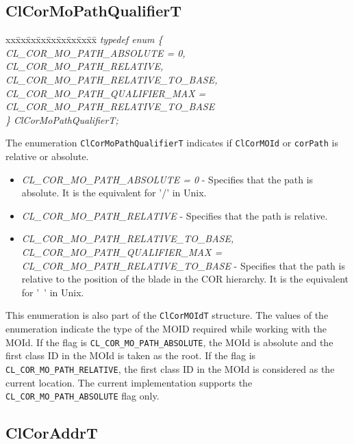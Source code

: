 \begin{flushleft}
\subsection{ClCorMoPathQualifierT}
\begin{tabbing}
xx\=xx\=xx\=xx\=xx\=xx\=xx\=xx\=xx\=\kill
\textit{typedef enum \{}\\
\>\>\>\>\textit{CL\_COR\_MO\_PATH\_ABSOLUTE = 0,}\\
\>\>\>\>\textit{CL\_COR\_MO\_PATH\_RELATIVE,}\\
\>\>\>\>\textit{CL\_COR\_MO\_PATH\_RELATIVE\_TO\_BASE, CL\_COR\_MO\_PATH\_QUALIFIER\_MAX =}\\
\>\>\>\>\textit{CL\_COR\_MO\_PATH\_RELATIVE\_TO\_BASE}\\
\textit{\} ClCorMoPathQualifierT;}\end{tabbing}

The enumeration {\tt{ClCorMoPathQualifierT}} indicates if {\tt{ClCorMOId}} or {\tt{corPath}} is relative or absolute.
\begin{itemize}
\item
\textit{CL\_\-COR\_\-MO\_\-PATH\_\-ABSOLUTE = 0} - Specifies that the path is absolute. It is the equivalent for '/' in Unix.
\item
\textit{CL\_\-COR\_\-MO\_\-PATH\_\-RELATIVE} - Specifies that the path is relative.
\item
\textit{CL\_\-COR\_\-MO\_\-PATH\_\-RELATIVE\_\-TO\_\-BASE, CL\_\-COR\_\-MO\_\-PATH\_\-QUALIFIER\_\-MAX = CL\_\-COR\_\-MO\_\-PATH\_\-RELATIVE\_\-TO\_\-BASE} - 
Specifies that the path is relative to the position of the blade in the COR hierarchy. It is the equivalent for '~' in Unix.
\end{itemize}
This enumeration is also part of the {\tt{ClCorMOIdT}} structure. The values of the enumeration indicate the type of the MOID required 
while working with the MOId. If the flag is {\tt{CL\_\-COR\_\-MO\_\-PATH\_\-ABSOLUTE}}, the MOId is absolute and the first class ID in the 
MOId is taken as the root. If the flag is {\tt{CL\_\-COR\_\-MO\_\-PATH\_\-RELATIVE}}, the first class ID in the MOId is considered as the current location. 
The current implementation supports the {\tt{CL\_\-COR\_\-MO\_\-PATH\_\-ABSOLUTE}} flag only.



\subsection{ClCorAddrT}


\end{flushleft}

